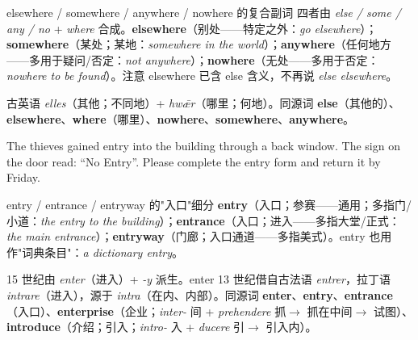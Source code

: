 \documentclass[../main.tex]{subfiles}
\begin{document}


\begin{gram}{elsewhere / somewhere / anywhere / nowhere 的复合副词}
四者由 \textit{else / some / any / no} + \textit{where} 合成。\textbf{elsewhere}（别处——特定之外：\textit{go elsewhere}）；\textbf{somewhere}（某处；某地：\textit{somewhere in the world}）；\textbf{anywhere}（任何地方——多用于疑问/否定：\textit{not anywhere}）；\textbf{nowhere}（无处——多用于否定：\textit{nowhere to be found}）。注意 elsewhere 已含 else 含义，不再说 \textit{else elsewhere}。
\end{gram}

\begin{origin}
古英语 \textit{elles}（其他；不同地）+ \textit{hwǣr}（哪里；何地）。同源词 \textbf{else}（其他的）、\textbf{elsewhere}、\textbf{where}（哪里）、\textbf{nowhere}、\textbf{somewhere}、\textbf{anywhere}。
\end{origin}


{The thieves gained entry into the building through a back window.}
{The sign on the door read: ``No Entry''.}
{Please complete the entry form and return it by Friday.}

\begin{gram}{entry / entrance / entryway 的"入口"细分}
\textbf{entry}（入口；参赛——通用；多指门/小道：\textit{the entry to the building}）；\textbf{entrance}（入口；进入——多指大堂/正式：\textit{the main entrance}）；\textbf{entryway}（门廊；入口通道——多指美式）。entry 也用作"词典条目"：\textit{a dictionary entry}。
\end{gram}

\begin{origin}
15 世纪由 \textit{enter}（进入）+ \textit{-y} 派生。enter 13 世纪借自古法语 \textit{entrer}，拉丁语 \textit{intrare}（进入），源于 \textit{intra}（在内、内部）。同源词 \textbf{enter}、\textbf{entry}、\textbf{entrance}（入口）、\textbf{enterprise}（企业；\textit{inter-} 间 + \textit{prehendere} 抓$\to$ 抓在中间$\to$ 试图）、\textbf{introduce}（介绍；引入；\textit{intro-} 入 + \textit{ducere} 引$\to$ 引入内）。
\end{origin}
\end{document}
